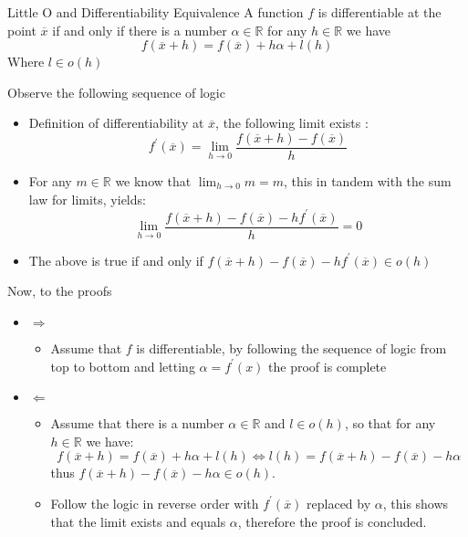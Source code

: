 \documentclass{standalone}
\begin{document}
\begin{prop*}{Little O and Differentiability Equivalence}
  A function $f$ is differentiable at the point $\overline{x}$ if and only if there is a number $ \alpha \in \mathbb{R}$ for any $h \in \mathbb{R}$ we have 
  \[
  f\left(\overline{x}  +  h\right) = f\left(\overline{x}\right)  +  h \alpha  +  l\left(h\right)
  \]
  Where $l \in o\left(h\right) $ 
  \begin{pf}
    Observe the following sequence of logic
    \begin{itemize}
      \item Definition of differentiability at $\overline{x}$, the following limit exists :
        \[
        f ^{\prime}\left(\overline{x}\right) = \lim_{h\to0}\frac{f\left(\overline{x}  +  h\right)  -  f\left(\overline{x}\right)}{h}
        \]
      \item For any $m \in \mathbb{R}$ we know that $\lim_{h\to0} m = m$, this in tandem with the sum law for limits, yields:
        \[
       \lim_{h\to0} \frac{f\left(\overline{x}  +  h\right)  -  f\left(\overline{x}\right)  -  h f ^{\prime}\left(\overline{x}\right)}{h} = 0
        \]
      \item The above is true if and only if $f\left(\overline{x}  +  h\right)  -  f\left(\overline{x}\right)  -  h f ^{\prime}\left(\overline{x}\right) \in o\left(h\right)$ 
    \end{itemize}
    Now, to the proofs
    \begin{itemize}
      \item $\Rightarrow$ 
        \begin{itemize}
          \item Assume that $f$ is differentiable, by following the sequence of logic from top to bottom and letting $\alpha = f ^{\prime}\left(x\right)$ the proof is complete
        \end{itemize}
      \item $\Leftarrow$ 
        \begin{itemize}
          \item Assume that there is a number $\alpha \in \mathbb{R}$ and $l \in o\left(h\right)$, so that for any $h \in \mathbb{R}$  we have:
            \[
            f\left(\overline{x}  +  h\right) = f\left(\overline{x}\right)  +  h \alpha+  l\left(h\right) \Leftrightarrow l\left(h\right) = f\left(\overline{x}  +  h\right)  -  f\left(\overline{x}\right)  -  h \alpha
            \]
            thus $f\left(\overline{x}  +  h\right)  -  f\left(\overline{x}\right)  -  h \alpha \in o\left(h\right)$.
        \item Follow the logic in reverse order with $f ^{\prime}\left(\overline{x}\right)$ replaced by $\alpha$, this shows that the limit exists and equals $\alpha$, therefore the proof is concluded.
        \end{itemize}

    \end{itemize}
  \end{pf}

\end{prop*}
\end{document}
